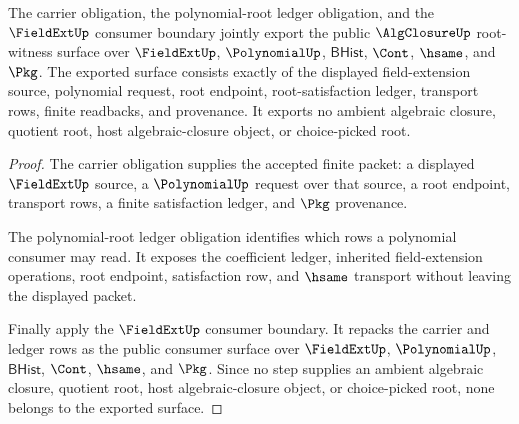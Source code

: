 \begin{theorem}
\label{thm:algclosure-public-root-witness-export}
The carrier obligation, the polynomial-root ledger obligation, and the
$\FieldExtUp$ consumer boundary jointly export the public $\AlgClosureUp$
root-witness surface over $\FieldExtUp$, $\PolynomialUp$, $\mathsf{BHist}$,
$\Cont$, $\hsame$, and $\Pkg$. The exported surface consists exactly of the
displayed field-extension source, polynomial request, root endpoint,
root-satisfaction ledger, transport rows, finite readbacks, and provenance. It
exports no ambient algebraic closure, quotient root, host algebraic-closure
object, or choice-picked root.
\end{theorem}
\begin{proof}
The carrier obligation supplies the accepted finite packet: a displayed
$\FieldExtUp$ source, a $\PolynomialUp$ request over that source, a root
endpoint, transport rows, a finite satisfaction ledger, and $\Pkg$ provenance.

The polynomial-root ledger obligation identifies which rows a polynomial
consumer may read. It exposes the coefficient ledger, inherited field-extension
operations, root endpoint, satisfaction row, and $\hsame$ transport without
leaving the displayed packet.

Finally apply the $\FieldExtUp$ consumer boundary. It repacks the carrier and
ledger rows as the public consumer surface over $\FieldExtUp$, $\PolynomialUp$,
$\mathsf{BHist}$, $\Cont$, $\hsame$, and $\Pkg$. Since no step supplies an
ambient algebraic closure, quotient root, host algebraic-closure object, or
choice-picked root, none belongs to the exported surface.
\end{proof}

